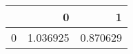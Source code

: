 \begin{tabular}{lrr}
\toprule
{} &         0 &         1 \\
\midrule
0 &  1.036925 &  0.870629 \\
\bottomrule
\end{tabular}
